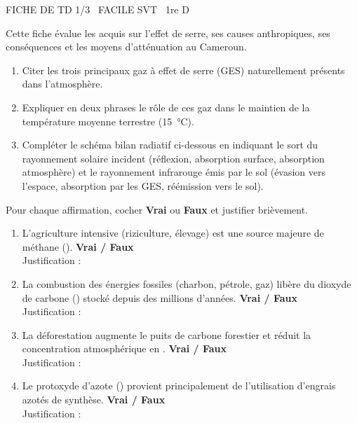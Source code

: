 \documentclass[11pt]{article}
\begin{document}
\begin{tcolorbox}[enhanced,colback=popink,colframe=popink,arc=10pt,boxrule=0pt,left=12pt,right=12pt,top=9pt,bottom=9pt]
{\color{white}\popxbold\small FICHE DE TD 1/3 \textbullet\ FACILE \hfill SVT \textbullet\ 1re D\par}
\end{tcolorbox}
\vspace{4pt}
Cette fiche évalue les acquis sur l'effet de serre, ses causes anthropiques, ses conséquences et les moyens d'atténuation au Cameroun.

\begin{exercice}
\label{exo:mecanisme}
\begin{enumerate}
    \item Citer les trois principaux gaz à effet de serre (GES) naturellement présents dans l'atmosphère.
    \item Expliquer en deux phrases le rôle de ces gaz dans le maintien de la température moyenne terrestre (\SI{15}{\celsius}).
    \item Compléter le schéma bilan radiatif ci-dessous en indiquant le sort du rayonnement solaire incident (réflexion, absorption surface, absorption atmosphère) et le rayonnement infrarouge émis par le sol (évasion vers l'espace, absorption par les GES, réémission vers le sol).
\end{enumerate}
\end{exercice}

\begin{exercice}
\label{exo:vf}
Pour chaque affirmation, cocher \textbf{Vrai} ou \textbf{Faux} et justifier brièvement.
\begin{enumerate}
    \item L'agriculture intensive (riziculture, élevage) est une source majeure de méthane (). \hfill \textbf{Vrai / Faux} \\
    Justification : \dotfill
    \item La combustion des énergies fossiles (charbon, pétrole, gaz) libère du dioxyde de carbone () stocké depuis des millions d'années. \hfill \textbf{Vrai / Faux} \\
    Justification : \dotfill
    \item La déforestation augmente le puits de carbone forestier et réduit la concentration atmosphérique en . \hfill \textbf{Vrai / Faux} \\
    Justification : \dotfill
    \item Le protoxyde d'azote () provient principalement de l'utilisation d'engrais azotés de synthèse. \hfill \textbf{Vrai / Faux} \\
    Justification : \dotfill
\end{enumerate}
\end{exercice}
\end{document}
